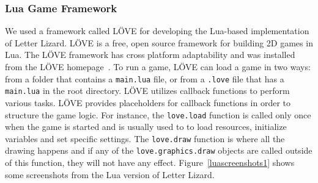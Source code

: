 \subsubsection{Lua Game Framework}
We used a framework called L\"OVE for developing the Lua-based implementation of Letter Lizard. L\"OVE is a free, open source framework for building 2D games in Lua. The L\"OVE framework has cross platform adaptability and was installed from the L\"OVE homepage~\cite{about_love}. To run a game, L\"OVE can load a game in two ways: from a folder that contains a \texttt{main.lua} file, or from a \texttt{.love} file that has a \texttt{main.lua} in the root directory. L\"OVE utilizes callback functions to perform various tasks. L\"OVE provides placeholders for callback functions in order to structure the game logic. For instance, the \texttt{love.load} function is called only once when the game is started and is usually used to to load resources, initialize variables and set specific settings. The \texttt{love.draw} function is where all the drawing happens and if any of the \texttt{love.graphics.draw} objects are called outside of this function, they will not have any effect. Figure~\ref{luascreenshots1} shows some screenshots from the Lua version of Letter Lizard.

